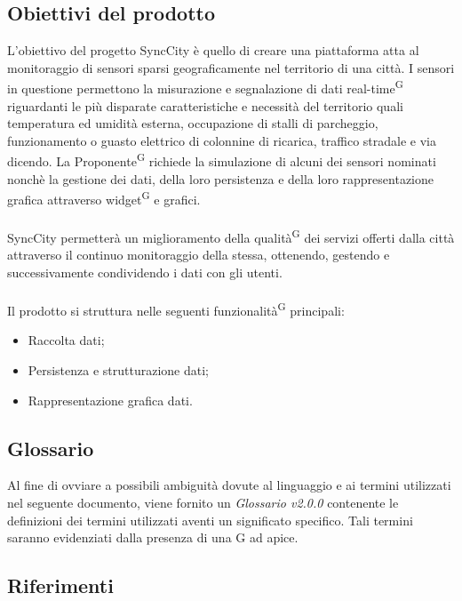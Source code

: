 \documentclass[8pt]{article}
\newcommand{\glossterm}[1]{#1\textsuperscript{G}} %
\begin{document}
\subsection{Obiettivi del prodotto}
L'obiettivo del progetto SyncCity è quello di creare una piattaforma atta al monitoraggio
di sensori sparsi geograficamente nel territorio di una città. I sensori in questione
permettono la misurazione e segnalazione di dati \glossterm{real-time} riguardanti le più disparate
caratteristiche e necessità del territorio quali temperatura ed umidità esterna, occupazione di
stalli di parcheggio, funzionamento o guasto elettrico di colonnine di ricarica, traffico stradale e via
dicendo. La \glossterm{Proponente} richiede la simulazione di alcuni dei sensori nominati nonchè la
gestione dei dati, della loro persistenza e della loro rappresentazione grafica attraverso
\glossterm{widget} e
grafici. \\\\SyncCity permetterà un miglioramento della \glossterm{qualità} dei servizi offerti dalla città attraverso il continuo monitoraggio della stessa, ottenendo, gestendo e successivamente condividendo i dati con gli utenti. 
\\\\
Il prodotto si struttura nelle seguenti \glossterm{funzionalità} principali:
\begin{itemize}
	\setlength\itemsep{0em}
	\item Raccolta dati;
	\item Persistenza e strutturazione dati;
	\item Rappresentazione grafica dati.
\end{itemize}
\subsection{Glossario} 
Al fine di ovviare a possibili ambiguità dovute al linguaggio e ai termini utilizzati nel seguente
documento, viene fornito un \textit{Glossario v2.0.0} contenente le definizioni dei termini utilizzati aventi un significato specifico. Tali termini saranno evidenziati dalla presenza di una G ad apice.
\subsection{Riferimenti}
\end{document}
